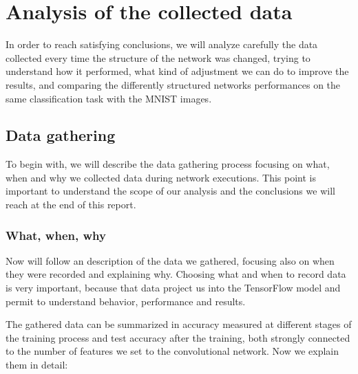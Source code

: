 \chapter{Analysis of the collected data}\label{ch:data_analysis}

In order to reach satisfying conclusions, we will analyze carefully the data collected every time the structure of the network was changed, trying to understand how it performed, what kind of adjustment we can do to improve the results, and comparing the differently structured networks performances on the same classification task with the \acs{MNIST} images.

\section{Data gathering}

To begin with, we will describe the data gathering process focusing on what, when and why we collected data during network executions. This point is important to understand the scope of our analysis and the conclusions we will reach at the end of this report.

\subsection{What, when, why}

Now will follow an description of the data we gathered, focusing also on when they were recorded and explaining why. Choosing what and when to record data is very important, because that data project us into the TensorFlow model and permit to understand behavior, performance and results.

The gathered data can be summarized in accuracy measured at different stages of the training process and test accuracy after the training, both strongly connected to the number of features we set to the convolutional network. Now we explain them in detail:

